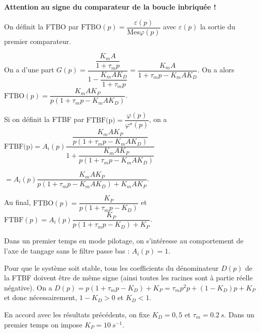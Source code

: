 \ifprof
\begin{corrige}
\textbf{Attention au signe du comparateur de la boucle inbriquée !}

On définit la FTBO par $\text{FTBO}(p)=\dfrac{\varepsilon(p)}{\text{Mes}\varphi(p)}$ avec $\varepsilon(p)$ la sortie du premier comparateur.

On a d'une part $G(p)=\dfrac{\dfrac{K_m A}{1+\tau_m p}}{1-\dfrac{K_m A K_D }{1+\tau_m p}}= \dfrac{K_m A}{1+\tau_m p-K_m A K_D }$.
On a alors $\text{FTBO}(p)=\dfrac{K_m A K_P}{p\left(1+\tau_m p-K_m A K_D \right)}$. 

Si on définit la FTBF par $\text{FTBF(p)}=\dfrac{\varphi(p)}{\varphi^{\star}(p)}$, on a 
$\text{FTBF(p)}=A_i(p)\dfrac{\dfrac{K_m A K_P}{p\left(1+\tau_m p-K_m A K_D \right)}}{1+\dfrac{K_m A K_P}{p\left(1+\tau_m p-K_m A K_D \right)}}$ 

$=A_i(p)\dfrac{K_m A K_P}{p\left(1+\tau_m p-K_m A K_D \right)+K_m A K_P}$.

Au final, 
$\text{FTBO}(p)=\dfrac{ K_P}{p\left(1+\tau_m p-K_D \right)}$ et 
$\text{FTBF}(p)=A_i(p)\dfrac{K_P}{p\left(1+\tau_m p- K_D \right)+K_P}$.
\end{corrige}
\else
\fi

Dans un premier temps en mode pilotage, on s’intéresse au comportement de l’axe de tangage sans le filtre passe bas :
$A_i(p)=1$.

\ifprof
\begin{corrige}
Pour que le système soit stable, tous les coefficients du dénominateur $D(p)$ de la FTBF doivent être de même signe (ainsi toutes les racines sont à partie réelle négative). On a 
$D(p)=p\left(1+\tau_m p- K_D \right)+K_P = \tau_m p^2 p+ \left(1-K_D \right)p +K_P$ et donc nécessairement, 
$1-K_D >0$ et $K_D < 1$.
\end{corrige}
\else
\fi

\ifprof
\else
En accord avec les résultats précédents, on fixe $K_D = 0,5$ et $\tau_m = \SI{0,2}{s}$.
Dans un premier temps on impose $K_P = \SI{10}{s^{-1}}$.
\fi
%
%


